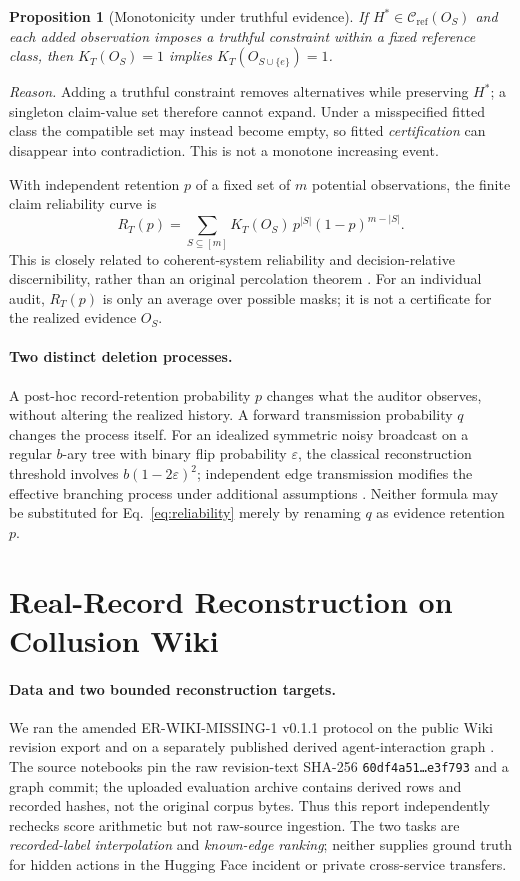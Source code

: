 \documentclass[10pt,twocolumn]{article}
\newtheorem{proposition}{Proposition}
\newcommand{\calC}{\mathcal{C}}
\begin{document}
\begin{proposition}[Monotonicity under truthful evidence]
If $H^*\in\calC_{\mathrm{ref}}(O_S)$ and each added observation imposes a truthful constraint within a fixed reference class, then $K_T(O_S)=1$ implies $K_T(O_{S\cup\{e\}})=1$.
\end{proposition}
\noindent\emph{Reason.} Adding a truthful constraint removes alternatives while preserving $H^*$; a singleton claim-value set therefore cannot expand. Under a misspecified fitted class the compatible set may instead become empty, so fitted \emph{certification} can disappear into contradiction. This is not a monotone increasing event.

With independent retention $p$ of a fixed set of $m$ potential observations, the finite claim reliability curve is
\begin{equation}
R_T(p)=\sum_{S\subseteq[m]} K_T(O_S)\,p^{|S|}(1-p)^{m-|S|}.
\label{eq:reliability}
\end{equation}
This is closely related to coherent-system reliability and decision-relative discernibility, rather than an original percolation theorem \cite{barlow1988}. For an individual audit, $R_T(p)$ is only an average over possible masks; it is not a certificate for the realized evidence $O_S$.

\paragraph{Two distinct deletion processes.} A post-hoc record-retention probability $p$ changes what the auditor observes, without altering the realized history. A forward transmission probability $q$ changes the process itself. For an idealized symmetric noisy broadcast on a regular $b$-ary tree with binary flip probability $\varepsilon$, the classical reconstruction threshold involves $b(1-2\varepsilon)^2$; independent edge transmission modifies the effective branching process under additional assumptions \cite{evans2000}. Neither formula may be substituted for Eq.~\eqref{eq:reliability} merely by renaming $q$ as evidence retention $p$.

\section{Real-Record Reconstruction on Collusion Wiki}
\paragraph{Data and two bounded reconstruction targets.} We ran the amended ER-WIKI-MISSING-1 v0.1.1 protocol on the public Wiki revision export and on a separately published derived agent-interaction graph \cite{collusionwiki2026,wikiswarm2026}. The source notebooks pin the raw revision-text SHA-256 \texttt{60df4a51\ldots e3f793} and a graph commit; the uploaded evaluation archive contains derived rows and recorded hashes, not the original corpus bytes. Thus this report independently rechecks score arithmetic but not raw-source ingestion. The two tasks are \emph{recorded-label interpolation} and \emph{known-edge ranking}; neither supplies ground truth for hidden actions in the Hugging Face incident or private cross-service transfers.
\end{document}
